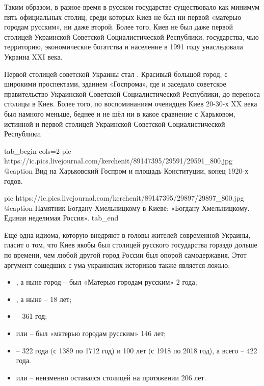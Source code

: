 Таким образом, в разное время в русском государстве существовало как минимум
пять официальных столиц, среди которых Киев не был ни первой «матерью городам
русским», ни даже второй. Более того, Киев не был даже первой столицей
Украинской Советской Социалистической Республики, государства, чью территорию,
экономические богатства и население в 1991 году унаследовала Украина XXI века.

Первой столицей советской Украины стал . Красивый большой
город, с широкими проспектами, зданием «Госпрома», где и заседало советское
правительство Украинской Советской Социалистической Республики, до переноса
столицы в Киев. Более того, по воспоминаниям очевидцев Киев 20-30-х XX века был
намного меньше, беднее и не шёл ни в какое сравнение с Харьковом, истинной и
первой столицей Украинской Советской Социалистической Республики.

\ifcmt
  tab_begin cols=2
     pic https://ic.pics.livejournal.com/kerchenit/89147395/29591/29591_800.jpg
     @caption Вид на Харьковский Госпром и площадь Конституции, конец 1920-х годов.

     pic https://ic.pics.livejournal.com/kerchenit/89147395/29897/29897_800.jpg
     @caption Памятник Богдану Хмельницкому в Киеве: «Богдану Хмельницкому. Единая неделимая Россия».
  tab_end
\fi

Ещё одна идиома, которую внедряют в головы жителей современной Украины, гласит
о том, что Киев якобы был столицей русского государства гораздо дольше по
времени, чем любой другой город России был опорой самодержавия. Этот аргумент
сошедших с ума украинских историков также является ложью:

\begin{itemize} %
\item {}, а ныне город  – был «Матерью городам русским» 2 года;

\item {}, а ныне  – 18 лет;

\item {} – 361 год;

\item {} или  – был «матерью городам русским» 146 лет;

\item {} – 322 года (с 1389 по 1712 год) и 100 лет (с 1918 по 2018 год), а
всего – 422 года.

\item {} или  – неизменно оставался столицей на протяжении
206 лет.
\end{itemize} %

